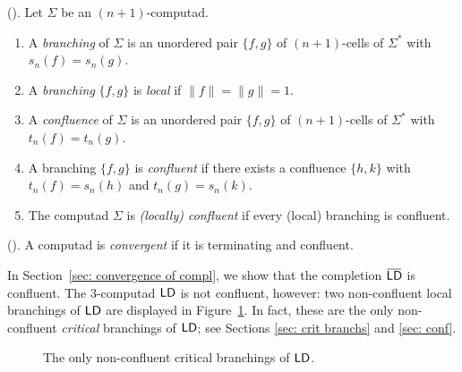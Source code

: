 \documentclass[reqno,12pt]{amsart}
\begin{document}
\begin{definition}(\cite[\S 4.1.3]{GuMa}).\label{def: branch and confl} Let $\Sigma$ be an $(n+1)$-computad.
	\begin{enumerate}[label=(\roman*)]
	\item A \emph{branching} of \(\Sigma\) is an unordered pair \(\{f,g\}\) of \((n+1)\)-cells of \(\Sigma^{\ast}\) with $s_n(f)=s_n(g)$.
	\item A \emph{branching} \(\{f,g\}\) is \emph{local} if \(\|f\|=\|g\|=1\).
	\item A \emph{confluence} of \(\Sigma\) is an unordered pair $\{f,g\}$ of \((n+1)\)-cells of \(\Sigma^{\ast}\) with $t_n(f)=t_n(g)$.
	\item A branching \(\{f,g\}\) is \emph{confluent} if there exists a confluence \(\{h,k\}\) with \(t_n(f)=s_n(h)\) and \(t_n(g)=s_n(k)\).
	\item The computad \(\Sigma\) is \emph{(locally) confluent} if every (local) branching is confluent.
	\end{enumerate}
\end{definition}

\begin{definition}(\cite[\S 4.1.4]{GuMa}).\label{def: convergent poly}
	A computad is \emph{convergent} if it is terminating and confluent.
\end{definition}

\begin{example}\label{ex: non-confluence}
	In Section~\ref{sec: convergence of compl}, we show that the completion $\highoverline{\ms{LD}}$ is confluent. The $3$-computad $\mathsf{LD}$ is not confluent, however: two non-confluent local branchings of $\mathsf{LD}$ are displayed in Figure~\ref{fig: non-confl LD}.
	In fact, these are the only non-confluent \emph{critical} branchings of $\mathsf{LD}$; see Sections \ref{sec: crit branchs} and \ref{sec: conf}.
	\begin{figure}[H]
		\centering
		\Critdistlronc \hspace{6em} 
		\Critdistrrpnc
		\caption{The only non-confluent critical branchings of $\mathsf{LD}$.}
		\label{fig: non-confl LD}
	\end{figure}
\end{example}
\end{document}
